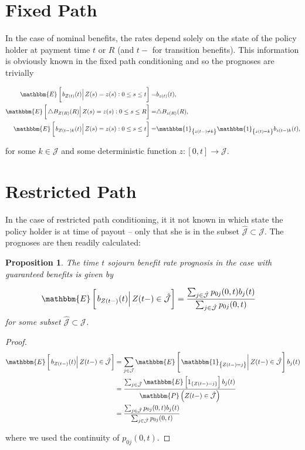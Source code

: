 \documentclass{book}
\newcommand{\1}[1]{\mathbbm{1}_{\left\lbrace #1 \right\rbrace}}
\newcommand{\expec}[1][def]{\mathbbm{E} \left[ #1 \right]}
\newcommand{\econd}[2][def]{\mathbbm{E} \left[ \left. #1 \right| #2 \right]}
\newcommand{\probability}[1][def]{\mathbbm{P} \left( #1 \right)}
\theoremstyle{break}
\newtheorem{proposition}[definition]{Proposition}%
\theoremstyle{remark}
\numberwithin{equation}{section}
\begin{document}
\section{Fixed Path}

In the case of nominal benefits, the rates depend solely on the state of the policy holder at payment time $t$ or $R$ (and $t-$ for transition benefits). This information is obviously known in the fixed path conditioning and so the prognoses are trivially

\begin{align*}
	\econd[b_{Z(t)}(t)]{Z(s) = z(s) : 0 \leq s \leq t} =& b_{z(t)}(t), \\
	\econd[\triangle B_{Z(R)}(R)]{Z(s) = z(s) : 0 \leq s \leq R} =& \triangle B_{z(R)}(R), \\
	\econd[b_{Z(t-)k}(t)]{ Z(s) = z(s) : 0 \leq s \leq t} =& \1{z(t-) \neq k} \1{z(t) = k} b_{z(t-) k}(t),
\end{align*}

for some $k \in \mathcal{J}$ and some deterministic function $z: [0,t] \to \mathcal{J}$.

\section{Restricted Path}

In the case of restricted path conditioning, it it not known in which state the policy holder is at time of payout -- only that she is in the subset $\hat{\mathcal{J}} \subset \mathcal{J}$. The prognoses are then readily calculated:

\begin{proposition} \label{SojournWithoutBonus}
The time $t$ sojourn benefit rate prognosis in the case with guaranteed benefits is given by

\begin{align*}
    \econd[b_{Z(t-)}(t)]{Z(t-) \in \hat{\mathcal{J}}}
    &= \frac{\sum_{j \in \hat{\mathcal{J}}} p_{0j}(0,t) b_j(t)}{\sum_{j \in \hat{\mathcal{J}}} p_{0j}(0,t)}
\end{align*}
for some subset $\hat{\mathcal{J}} \subset \mathcal{J}$.
\end{proposition}

\begin{proof}
\begin{align*}
   	\econd[b_{Z(t-)}(t)]{Z(t-) \in \hat{\mathcal{J}}} &= \sum_{j \in \mathcal{J}} \econd[\1{Z(t-)=j}]{Z(t-) \in \hat{\mathcal{J}}} b_j(t) \\
    &= \frac{\sum_{j \in \hat{\mathcal{J}}} \expec[ 1_{\{Z(t-)=j\}} ] b_j(t)}{\probability[Z(t-) \in \hat{\mathcal{J}}]} \\
    &= \frac{\sum_{j \in \hat{\mathcal{J}}} p_{0j}(0,t) b_j(t)}{\sum_{j \in \hat{\mathcal{J}}} p_{0j}(0,t)}
\end{align*}

where we used the continuity of $p_{0j}(0,t)$.
\end{proof}
\end{document}
